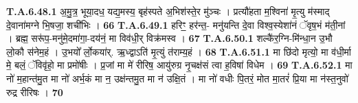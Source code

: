 \documentclass[17pt]{extarticle}
\begin{document}
                  \newline
                                                         \textbf{} \newline \newline
                                \textbf{ T.A.6.48.1} \newline
                  अ॒मु॒त्र॒ भूया॒दध॒ यद्य॒मस्य॒ बृह॑स्पते अ॒भिश॑स्ते॒र मु॑ञ्चः । प्रत्यौ॑हता म॒श्विना॑ मृ॒त्यु म॑स्माद् दे॒वाना॑मग्ने भि॒षजा॒ शची॑भिः । \textbf{ 66} \newline
                  \newline
                                                         \textbf{} \newline \newline
                                \textbf{ T.A.6.49.1} \newline
                  हरिꣳ॒॒ हर॑न्त॒- मनु॑यन्ति दे॒वा विश्व॒स्येशा॑नं ॅवृष॒भं म॑ती॒नां । ब्रह्म॒ सरू॑प॒-मनु॑मे॒दमा॑गा॒-दय॑नं॒ मा विव॑धी॒र् विक्र॑मस्व । \textbf{ 67} \newline
                  \newline
                                                         \textbf{} \newline \newline
                                \textbf{ T.A.6.50.1} \newline
                  शल्कै॑र॒ग्नि-मि॑न्धा॒न उ॒भौ लो॒कौ स॑नेम॒हं ।  उ॒भयो᳚ र्लो॒कया॑र्. ऋ॒ध्द्वाऽति॑ मृ॒त्युं त॑राम्य॒हं । \textbf{ 68} \newline
                  \newline
                                                         \textbf{} \newline \newline
                                \textbf{ T.A.6.51.1} \newline
                  मा छि॑दो मृत्यो॒ मा व॑धी॒र्मा मे॒ बलं॒ ॅविवृ॑हो॒ मा प्रमो॑षीः । प्र॒जां मा मे॑ रीरिष॒ आयु॑रुग्र नृ॒चक्ष॑सं त्वा ह॒विषा॑ विधेम । \textbf{ 69} \newline
                  \newline
                                                         \textbf{} \newline \newline
                                \textbf{ T.A.6.52.1} \newline
                  मा नो॑ म॒हान्त॑मु॒त मा नो॑ अर्भ॒कं मा न॒ उक्ष॑न्तमु॒त मा न॑ उक्षि॒तं ।  मा नो॑ वधीः पि॒तरं॒ मोत मा॒तरं॑ प्रि॒या मा न॑स्त॒नुवो॑ रुद्र रीरिषः । \textbf{ 70} \newline
\end{document}

